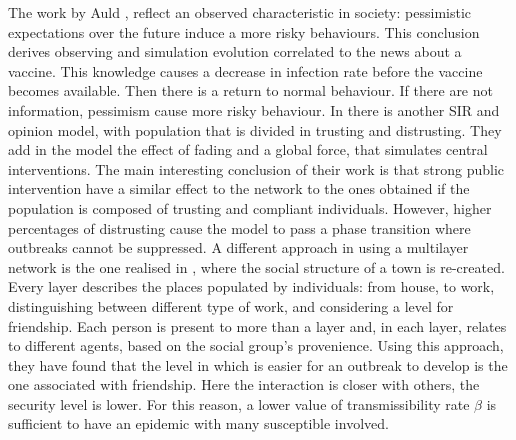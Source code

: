 The work by Auld \cite{Auld_2003}, reflect an observed characteristic in society: pessimistic expectations over the future induce a more risky behaviours. This conclusion derives observing and simulation evolution correlated to the news about a vaccine. This knowledge causes a decrease in infection rate before the vaccine becomes available. Then there is a return to normal behaviour. If there are not information, pessimism cause more risky behaviour. 
In \cite{Sontag2022} there is another SIR and opinion model, with population that is divided in trusting and distrusting. They add in the model the effect of fading and a global force, that simulates central interventions. The main interesting conclusion of their work is that strong public intervention have a similar effect to the network to the ones obtained if the population is composed of trusting and compliant individuals. However, higher percentages of distrusting cause the model to pass a phase transition where outbreaks cannot be suppressed. 
A different approach in using a multilayer network is the one realised in \cite{Turker_2023}, where the social structure of a town is re-created. Every layer describes the places populated by individuals: from house, to work, distinguishing between different type of work, and considering a level for friendship. Each person is present to more than a layer and, in each layer, relates to different agents, based on the social group’s provenience.  Using this approach, they have found that the level in which is easier for an outbreak to develop is the one associated with friendship. Here the interaction is closer with others, the security level is lower. For this reason, a lower value of transmissibility rate $\beta$ is sufficient to have an epidemic with many susceptible involved. 

